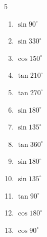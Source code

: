 \begin{multicols}{5}
\begin{enumerate}
  \item $\displaystyle \sin{90^\circ}$

        \phantom{$\displaystyle =1$}

  \item $\displaystyle \sin{330^\circ}$


  \item $\displaystyle \cos{150^\circ}$


  \item $\displaystyle \tan{210^\circ}$


  \item $\displaystyle \tan{270^\circ}$

        \phantom{$\displaystyle なし$}

  \item $\displaystyle \sin{180^\circ}$

        \phantom{$\displaystyle =0$}

  \item $\displaystyle \sin{135^\circ}$


  \item $\displaystyle \tan{360^\circ}$

        \phantom{$\displaystyle =0$}

  \item $\displaystyle \sin{180^\circ}$

        \phantom{$\displaystyle =0$}

  \item $\displaystyle \sin{135^\circ}$


  \item $\displaystyle \tan{90^\circ}$

        \phantom{$\displaystyle なし$}

  \item $\displaystyle \cos{180^\circ}$

        \phantom{$\displaystyle =-1$}

  \item $\displaystyle \cos{90^\circ}$

        \phantom{$\displaystyle =0$}


\end{enumerate}
\end{multicols}
